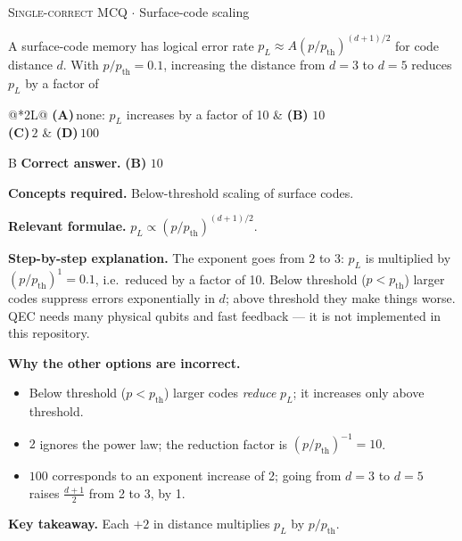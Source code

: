 \documentclass[11pt,a4paper]{article}
\newcommand{\optlabel}[1]{\textbf{(#1)}}
\newcommand{\correctlabel}[1]{\textcolor{okgreen}{\textbf{(#1)}\,\ding{51}}}
\newenvironment{qitem}[1]{\begin{list}{}{\setlength{\leftmargin}{3.3em}\setlength{\labelwidth}{3.1em}%
  \setlength{\labelsep}{0.2em}\setlength{\topsep}{3pt}\setlength{\parsep}{3pt}}\item[\textbf{Q.#1}\hfill]}{\end{list}}
\newcommand{\qsep}{\par\vspace{2pt}{\color{black!15}\hrule}\vspace{4pt}}
\newcommand{\qmeta}[2]{{\footnotesize\color{black!60}\textsc{#1} \;$\cdot$\; #2}\par}
\begin{document}
\begin{qitem}{71}
\qmeta{Single-correct MCQ}{Surface-code scaling}
A surface-code memory has logical error rate $p_L \approx A(p/p_{\text{th}})^{(d+1)/2}$ for code distance $d$. With $p/p_{\text{th}} = 0.1$, increasing the distance from
$d = 3$ to $d = 5$ reduces $p_L$ by a factor of
\par\smallskip\noindent\begin{tabularx}{\linewidth}{@{}*{2}{L}@{}}
\optlabel{A}\,none: $p_L$ increases by a factor of 10 & \correctlabel{B}\,$10$ \\[3pt]
\optlabel{C}\,$2$ & \optlabel{D}\,$100$
\end{tabularx}
\end{qitem}
\begin{solbox}{B}
\textbf{\color{brand}Correct answer.} \textcolor{okgreen}{\textbf{(B)}} $10$

\textbf{\color{brand}Concepts required.} Below-threshold scaling of surface codes.

\textbf{\color{brand}Relevant formulae.} $p_L \propto (p/p_{\text{th}})^{(d+1)/2}$.

\textbf{\color{brand}Step-by-step explanation.} The exponent goes from $2$ to $3$: $p_L$ is multiplied by $(p/p_{\text{th}})^{1} = 0.1$, i.e.\ reduced by a factor of 10. Below threshold ($p < p_{\text{th}}$) larger
codes suppress errors exponentially in $d$; above threshold they make things worse. QEC needs many physical qubits and fast feedback --- it is not
implemented in this repository.

\textbf{\color{brand}Why the other options are incorrect.}
\begin{itemize}[leftmargin=2.4em, itemsep=1pt, topsep=2pt]
\item[\textbf{(A)}] Below threshold ($p < p_{\text{th}}$) larger codes \emph{reduce} $p_L$; it increases only above threshold.
\item[\textbf{(C)}] $2$ ignores the power law; the reduction factor is $(p/p_{\text{th}})^{-1} = 10$.
\item[\textbf{(D)}] $100$ corresponds to an exponent increase of 2; going from $d = 3$ to $d = 5$ raises $\frac{d+1}{2}$ from 2 to 3, by 1.
\end{itemize}
\textbf{\color{brand}Key takeaway.} Each $+2$ in distance multiplies $p_L$ by $p/p_{\text{th}}$.
\end{solbox}
\qsep
\end{document}
